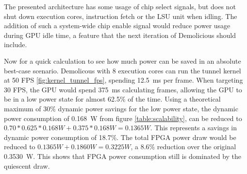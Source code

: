 \documentclass[../main/report.tex]{subfiles}
\begin{document}
The presented architecture has some usage of chip select signals, but does not shut down execution cores, instruction fetch or the LSU unit when idling.
The addition of such a system-wide chip enable signal would reduce power usage during GPU idle time, a feature that the next iteration of Demolicious should include.

Now for a quick calculation to see how much power can be saved in an absolute best-case scenario.
Demolicous with 8 execution cores can run the tunnel kernel at 50 FPS \ref{fig:kernel_tunnel_fps}, spending \SI{12.5}{ms} per frame.
When targeting 30 FPS, the GPU would spend \SI{375}{ms} calculating frames, allowing the GPU to be in a low power state for almost 62.5\% of the time.
Using a theoretical maximum of 30\% dynamic power savings for the low power state, the dynamic power consumption of \SI{0.168}{W} from figure \ref{table:scalability}, can be reduced to $ 0.70 * 0.625 * 0.168 W + 0.375 * 0.168 W = 0.1365 W$.
This represents a savings in dynamic power consumption of 18.7\%.
The total FPGA power draw would be reduced to $ 0.1365 W + 0.1860 W = 0.3225 W$, a 8.6\% reduction over the original \SI{0.3530}{W}.
This shows that FPGA power consumption still is dominated by the quiescent draw.
\end{document}
